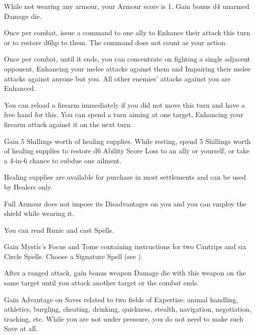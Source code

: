 \documentclass[itdr]{subfiles}
\begin{document}
\vfill
{}\featmt\feathp
While not wearing any armour, your Armour score is 1. Gain bonus d4 unarmed Damage die.

\vfill
{}
Once per combat, issue a command to one ally to Enhance their attack this turn or to restore d6hp to them. The command does not count as your action.

\break

\feathp
Once per combat, until it ends, you can concentrate on fighting a single adjacent opponent, Enhancing your melee attacks against them and Impairing their melee attacks against anyone but you. All other \mbox{enemies'} attacks against you are Enhanced.

\vfill
{}
You can reload a firearm immediately if you did not move this turn and have a free hand for this.
You can spend a turn aiming at one target, Enhancing your firearm attack against it on the next turn.

\vfill
{}
Gain 5 Shillings worth of healing supplies.
While resting, spend 5 Shillings worth of healing supplies to restore d6 Ability Score Loss to an ally or yourself, or take a 4-in-6 chance to subdue one ailment.

Healing supplies are available for purchase in most settlements and can be used by Healers only.

\vfill
{}
\feathp
Full Armour does not impose its Disadvantages on you and you can employ the shield while wearing it.

\vfill
{}
\featmt
You can read Runic and cast Spells.

Gain Mystic's Focus and Tome containing instructions for two Cantrips and six  Circle Spells. Choose a Signature Spell (see \textbf{}).

\vfill
{}
After a ranged attack, gain bonus weapon Damage die with this weapon on the same target until you attack another target or the combat ends.

\vfill
{}
\featmt
Gain Advantage on Saves related to two fields of \mbox{Expertise:} animal handling, athletics, burgling, cheating, drinking, quickness, stealth, navigation, negotiation, tracking, etc. While you are not under pressure, you do not need to make such Save at all.
\end{document}
